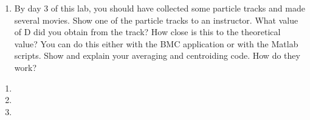 \documentclass{../signatures}
\begin{document}

\begin{enumerate}

\item By day 3 of this lab, you should have collected some particle tracks and made several movies. Show one of the particle tracks to an instructor. What value of D did you obtain from the track? How close is this to the theoretical value? You can do this either with the BMC application or with the Matlab scripts. Show and explain your averaging and centroiding code. How do they work? 
\\[36pt]
\end{enumerate}


\newpage
\checkpointsection 

\begin{enumerate}

\item {}

\item {}

\item {}

\end{enumerate}
\end{document}
